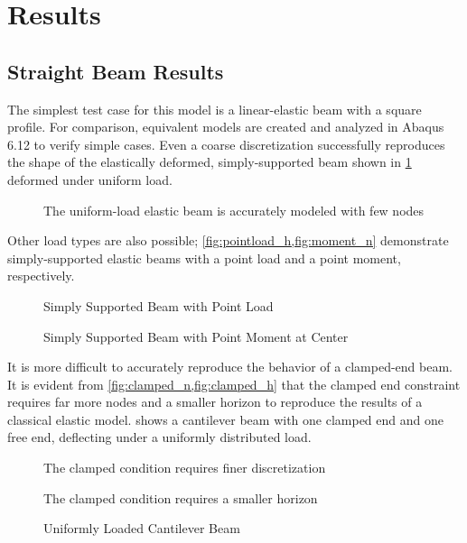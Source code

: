 \section{Results}
\label{sec:Results}
\FloatBarrier
\subsection{Straight Beam Results}
The simplest test case for this model is a linear-elastic beam with a square profile.
For comparison, equivalent models are created and analyzed in Abaqus 6.12 to verify simple cases.
Even a coarse discretization successfully reproduces the shape of the elastically deformed, simply-supported beam shown  in \cref{fig:elastic_g2000} deformed under uniform load.
%
\begin{figure}[htbp]
  \centering
  \resizebox{0.6\linewidth}{!}{}
  \caption{The uniform-load elastic beam is accurately modeled with few nodes}
  \label{fig:elastic_g2000}
\end{figure}
%
Other load types are also possible; \cref{fig:pointload_h,fig:moment_n} demonstrate simply-supported elastic beams with a point load and a point moment, respectively.
%
\begin{figure}[htbp]
  \centering
  \resizebox{0.6\linewidth}{!}{}
  \caption{Simply Supported Beam with Point Load}
  \label{fig:pointload_h}
\end{figure}
%
%
\begin{figure}[htbp]
  \centering
  \resizebox{0.6\linewidth}{!}{}
  \caption{Simply Supported Beam with Point Moment at Center}
  \label{fig:moment_n}
\end{figure}
%

It is more difficult to accurately reproduce the behavior of a clamped-end beam.
It is evident from \cref{fig:clamped_n,fig:clamped_h} that the clamped end constraint requires far more nodes and a smaller horizon to reproduce the results of a classical elastic model.
 shows a cantilever beam with one clamped end and one free end, deflecting under a uniformly distributed load.
%
\begin{figure}[htbp]
  \centering
  \resizebox{0.6\linewidth}{!}{}
  \caption{The clamped condition requires finer discretization}
  \label{fig:clamped_n}
\end{figure}
%
%
\begin{figure}[htbp]
  \centering
  \resizebox{0.6\linewidth}{!}{}
  \caption{The clamped condition requires a smaller horizon}
  \label{fig:clamped_h}
\end{figure}
%
%
\begin{figure}[htbp]
  \centering
  \resizebox{0.6\linewidth}{!}{}
  \caption{Uniformly Loaded Cantilever Beam}
  \label{fig:cantilever_n}
\end{figure}
%

